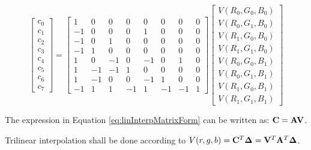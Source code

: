 \begin{equation} \label{eq:linInterpMatrixForm}
    \begin{bmatrix}
    c_0 \\ c_1 \\ c_2 \\ c_3 \\ c_4 \\ c_5 \\ c_6 \\ c_7
    \end{bmatrix} =
    \begin{bmatrix}
    1 & 0 & 0 & 0 & 0 & 0 & 0 & 0 \\
    -1 & 0 & 0 & 0 & 1 & 0 & 0 & 0 \\
    -1 & 0 & 1 & 0 & 0 & 0 & 0 & 0 \\
    -1 & 1 & 0 & 0 & 0 & 0 & 0 & 0 \\
    1 & 0 & -1 & 0 & -1 & 0 & 1 & 0 \\
    1 & -1 & -1 & 1 & 0 & 0 & 0 & 0 \\
    1 & -1 & 0 & 0 & -1 & 1 & 0 & 0 \\
    -1 & 1 & 1 & -1 & 1 & -1 & -1 & 1
    \end{bmatrix}
    \begin{bmatrix}
    V(R_0, G_0, B_0) \\
    V(R_0, G_1, B_0) \\
    V(R_1, G_0, B_0) \\
    V(R_1, G_1, B_0) \\
    V(R_0, G_0, B_1) \\
    V(R_0, G_1, B_1) \\
    V(R_1, G_0, B_1) \\
    V(R_1, G_1, B_1)
    \end{bmatrix}    
\end{equation}

The expression in Equation \ref{eq:linInterpMatrixForm} can be written as: $\mathbf{C} = \mathbf{A}\mathbf{V}$.

Trilinear interpolation shall be done according to $V(r,g,b) = \mathbf{C}^T \mathbf{\Delta} = \mathbf{V}^T \mathbf{A}^T \mathbf{\Delta}$.



